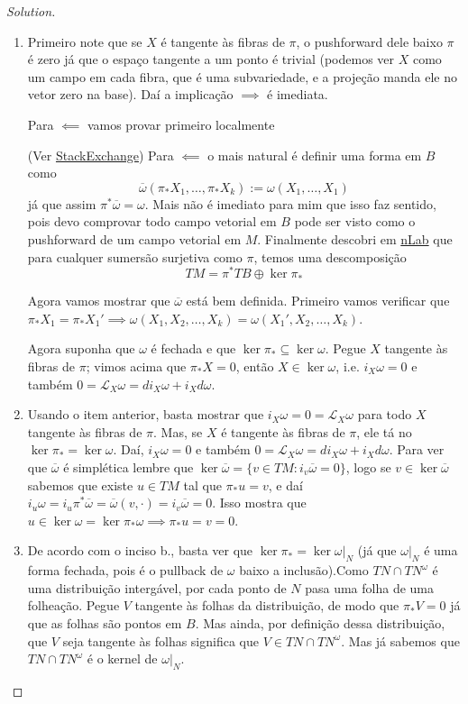 \begin{proof}[Solution]\leavevmode
\begin{enumerate}[label=\alph*.]
	\item Primeiro note que se $X$ é tangente às fibras de $\pi$, o pushforward dele baixo $\pi$ é zero já que o espaço tangente a um ponto é trivial (podemos ver $X$ como um campo em cada fibra, que é uma subvariedade, e a projeção manda ele no vetor zero na base). Daí a implicação $\implies $ é imediata.

	Para $\impliedby$ vamos provar primeiro localmente

	(Ver \href{https://math.stackexchange.com/questions/69658/basic-differential-forms}{StackExchange}) Para $\impliedby$ o mais natural é definir uma forma em $B$ como
	\[\overline{\omega}(\pi_*X_1,\ldots,\pi_*X_k):=\omega(X_1,\ldots,X_1)\]
já que assim $\pi^*\overline{\omega}=\omega$. Mais não é imediato para mim que isso faz sentido, pois devo comprovar todo campo vetorial em $B$ pode ser visto como o pushforward de um campo vetorial em $M$. Finalmente descobri em \href{https://ncatlab.org/nlab/show/vertical+vector+field}{nLab} que para cualquer sumersão surjetiva como $\pi$, temos uma descomposição
\[TM=\pi^*TB\oplus \ker \pi_*\]

Agora vamos mostrar que $\overline{\omega}$ está bem definida. Primeiro vamos verificar que  {\color{4}$\pi_*X_1=\pi_*X_1'\implies \omega(X_1,X_2,\ldots,X_k)=\omega(X_1',X_2,\ldots,X_k)$.}

Agora suponha que $\omega$ é fechada e que $\ker \pi_*\subseteq \ker \omega$. Pegue $X$ tangente às fibras de $\pi$; vimos acima que $\pi_*X=0$, então $X\in\ker \omega$, i.e. $i_X\omega=0$ e também $0=\mathcal{L}_{X}\omega =di_X\omega+i_Xd\omega$.

\item Usando o item anterior, basta mostrar que $i_X\omega =0=\mathcal{L}_{X}\omega$ para todo $X$ tangente às fibras de $\pi$. Mas, se $X$ é tangente às fibras de $\pi$, ele tá no $\ker \pi_*=\ker \omega$. Daí, $i_X\omega=0$ e também $0=\mathcal{L}_{X}\omega=di_X\omega+i_Xd\omega$. Para ver que $\overline{\omega}$ é simplética lembre que $\ker \overline{\omega}=\{v\in TM: i_{v}\overline{\omega}=0\}$, logo se $v\in\ker \overline{\omega}$ sabemos que existe $u\in TM$ tal que $\pi_*u=v$, e daí $i_u\omega=i_u\pi^*\overline{\omega}=\overline{\omega}(v,\cdot )=i_v\overline{\omega}=0$. Isso mostra que $u\in\ker \omega=\ker \pi_*\omega\implies \pi_*u=v=0$.

	\item De acordo com o inciso b., basta ver que $\ker \pi_*=\ker \omega|_{N}$ (já que $\omega|_{N}$ é uma forma fechada, pois é o pullback de $\omega$ baixo a inclusão).Como $TN\cap TN^\omega$ é uma distribuição intergável, por cada ponto de $N$ pasa uma folha de uma folheação. Pegue $V$ tangente às folhas da distribuição, de modo que  $\pi_*V=0$ já que as folhas são pontos em $B$. Mas ainda, por definição dessa distribuição, que $V$ seja tangente às folhas significa que $V\in TN\cap TN^\omega$. Mas já sabemos que $TN\cap TN^{\omega}$ é o kernel de $\omega|_{N}$.


\end{enumerate}
\end{proof}
